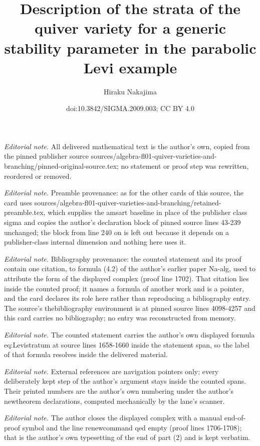 \documentclass[10pt,a4paper]{amsart}
\title{Description of the strata of the quiver variety for a generic stability parameter in the parabolic Levi example}
\author{Hiraku Nakajima}
\date{doi:10.3842/SIGMA.2009.003; CC BY 4.0}
\theoremstyle{definition}
\numberwithin{equation}{section}
\begin{document}
\maketitle
\noindent\textit{Editorial note.} All delivered mathematical text is the author's own, copied from the pinned publisher source sources/algebra-fl01-quiver-varieties-and-branching/pinned-original-source.tex; no statement or proof step was rewritten, reordered or removed.\par\medskip
\noindent\textit{Editorial note.} Preamble provenance: as for the other cards of this source, the card uses sources/algebra-fl01-quiver-varieties-and-branching/retained-preamble.tex, which supplies the amsart baseline in place of the publisher class sigma and copies the author's declaration block of pinned source lines 43-239 unchanged; the block from line 240 on is left out because it depends on a publisher-class internal dimension and nothing here uses it.\par\medskip
\noindent\textit{Editorial note.} Bibliography provenance: the counted statement and its proof contain one citation, to formula (4.2) of the author's earlier paper Na-alg, used to attribute the form of the displayed complex (proof line 1702). That citation lies inside the counted proof; it names a formula of another work and is a pointer, and the card declares its role here rather than reproducing a bibliography entry. The source's thebibliography environment is at pinned source lines 4098-4257 and this card carries no bibliography; no entry was reconstructed from memory.\par\medskip
\noindent\textit{Editorial note.} The counted statement carries the author's own displayed formula eq:Levistratum at source lines 1658-1660 inside the statement span, so the label of that formula resolves inside the delivered material.\par\medskip
\noindent\textit{Editorial note.} External references are navigation pointers only; every deliberately kept step of the author's argument stays inside the counted spans. Their printed numbers are the author's own numbering under the author's newtheorem declarations, computed mechanically by the lane's scanner.\par\medskip
\noindent\textit{Editorial note.} The author closes the displayed complex with a manual end-of-proof symbol and the line renewcommand qed empty (proof lines 1706-1708); that is the author's own typesetting of the end of part (2) and is kept verbatim.\par\medskip
\end{document}
